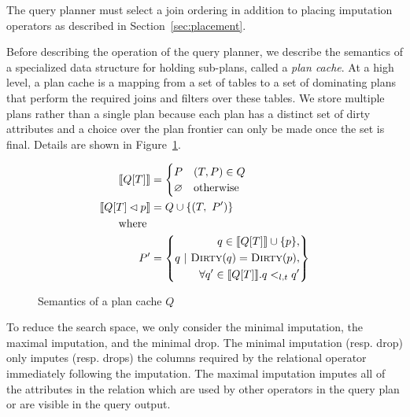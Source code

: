 The query planner must select a join ordering in addition to placing imputation operators as described in Section~\ref{sec:placement}.

Before describing the operation of the query planner, we describe the semantics of a specialized data structure for holding sub-plans, called a \emph{plan cache}.
At a high level, a plan cache is a mapping from a set of tables to a set of dominating plans that perform the required joins and filters over these tables.
We store multiple plans rather than a single plan because each plan has a distinct set of dirty attributes and a choice over the plan frontier
can only be made once the set is final. Details are shown in Figure~\ref{fig:semantics-plan-cache}.

\begin{figure}
  \begin{align*}
    \llbracket Q[T] \rrbracket &= \begin{cases}
      P & (T, P) \in Q \\
      \varnothing & \text{otherwise} \\
    \end{cases} \\
    \llbracket Q[T] \lhd p \rrbracket &= \begin{aligned} Q \cup \{(T,\ P') \} \end{aligned}\\
                                            \text{ where } \\
                                           P' &= \left\{q ~|~ \begin{aligned}
                                                                     q \in \llbracket Q[T] \rrbracket \cup \{p\}, \\
                                                                     \textsc{Dirty}(q) = \textsc{Dirty}(p),\\
                                                                     \forall q' \in \llbracket Q[T] \rrbracket.  q <_{l,t} q' 
                                                                   \end{aligned}
                                           \right\}
  \end{align*}
  \caption{Semantics of a plan cache $Q$}
  \label{fig:semantics-plan-cache}
\end{figure}

To reduce the search space, we only consider the minimal imputation, the maximal imputation, and the minimal drop. The minimal imputation (resp. drop) only imputes (resp. drops) the columns required by the relational operator immediately following the imputation. The maximal imputation imputes all of the attributes in the relation which are used by other operators in the query plan or are visible in the query output.


